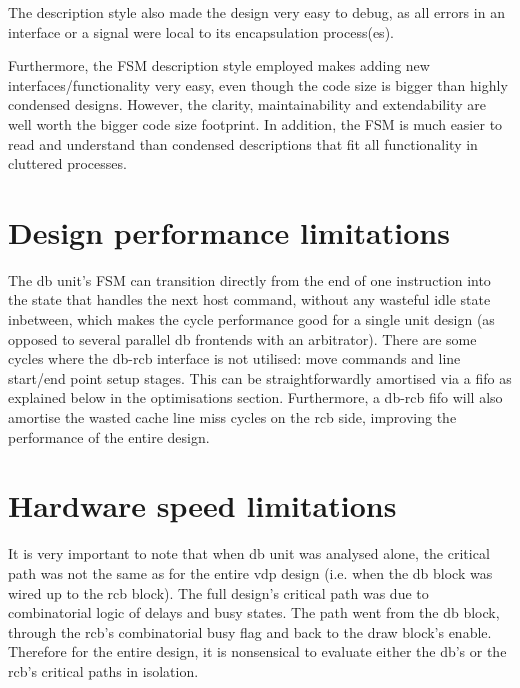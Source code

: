 \documentclass[]{article}
\begin{document}
The description style also made the design very easy to debug, as all errors in an interface or a signal were local to its encapsulation process(es).

Furthermore, the FSM description style employed makes adding new interfaces/functionality very easy, even though the code size is bigger than highly condensed designs. However, the clarity, maintainability and extendability are well worth the bigger code size footprint. In addition, the FSM is much easier to read and understand than condensed descriptions that fit all functionality in cluttered processes.

\section{Design performance limitations} %
\label{sec:design_performance_limitations}


The db unit's FSM can transition directly from the end of one instruction into the state that handles the next host command, without any wasteful idle state inbetween, which makes the cycle performance good for a single unit design (as opposed to several parallel db frontends with an arbitrator). There are some cycles where the db-rcb interface is not utilised: move commands and line start/end point setup stages. This can be straightforwardly amortised via a fifo as explained below in the optimisations section. Furthermore, a db-rcb fifo will also amortise the wasted cache line miss cycles on the rcb side, improving the performance of the entire design.

\section{Hardware speed limitations} %
\label{sec:hardware_speed_limitations}


It is very important to note that when db unit was analysed alone, the critical path was not the same as for the entire vdp design (i.e. when the db block was wired up to the rcb block). The full design's critical path was due to combinatorial logic of delays and busy states. The path went from the db block, through the rcb's combinatorial busy flag and back to the draw block's enable. Therefore for the entire design, it is nonsensical to evaluate either the db's or the rcb's critical paths in isolation.
\end{document}
